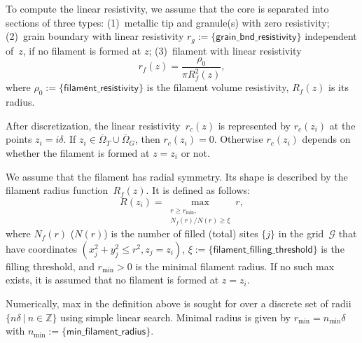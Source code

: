 \documentclass[10pt]{article}
\begin{document}
To compute the linear resistivity, we assume that the core is separated into
sections of three types: (1)~metallic tip and granule(s) with zero resistivity;
(2)~grain boundary with linear resistivity
$r_g := \{ \mathsf{grain\_bnd\_resistivity} \}$ independent of~$z$, if no
filament is formed at $z$; (3)~filament with linear resistivity
\begin{equation}
	r_f(z) = \frac{\rho_0}{\pi R_f^2(z)},
\end{equation}
where $\rho_0 := \{ \mathsf{filament\_resistivity} \}$ is the filament volume
resistivity, $R_f(z)$ is its radius.

After discretization, the linear resistivity~$r_c(z)$ is represented by $r_c(z_i)$
at the points $z_i = i \delta$. If $z_i \in \overline\Omega_T \cup
	\overline\Omega_G$, then $r_c(z_i) = 0$. Otherwise $r_c(z_i)$ depends on whether
the filament is formed at $z = z_i$ or not.

We assume that the filament has radial symmetry. Its shape is described by the
filament radius function~$R_f(z)$. It is defined as follows:
\begin{equation}
	R(z_i) = \max_{\substack{r \geq r_{\min}, \\ N_f(r)/N(r) \geq \xi}} r,
\end{equation}
where $N_f(r)$ ($N(r)$) is the number of filled (total) sites $\{ j \}$
in the grid~$\mathcal{G}$ that have coordinates $(x_j^2 + y_j^2 \leq r^2, z_j = z_i)$,
$\xi := \{ \mathsf{filament\_filling\_threshold} \}$ is the filling threshold, and
$r_{\min} > 0$ is the minimal filament radius. If no such max exists, it is assumed
that no filament is formed at $z = z_i$.

Numerically, max in the definition above is sought for over a discrete set of
radii $\{ n\delta \ | \ n \in \mathbb{Z} \}$ using simple linear search. Minimal
radius is given by $r_{\min} = n_{\min} \delta$ with
$n_{\min} := \{ \mathsf{min\_filament\_radius} \}$.
\end{document}
